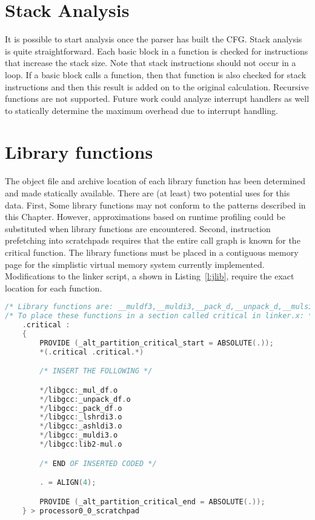 \section{Stack Analysis}
It is possible to start analysis once the parser has built the CFG. Stack analysis is quite straightforward. Each basic block in a function is checked for instructions that increase the stack size. Note that stack instructions should not occur in a loop. If a basic block calls a function, then that function is also checked for stack instructions and then this result is added on to the original calculation. Recursive functions are not supported. Future work could analyze interrupt handlers as well to statically determine the maximum overhead due to interrupt handling.


\section{Library functions}

The object file and archive location of each library function has been determined and made statically available. There are (at least) two potential uses for this data. First, Some library functions may not conform to the patterns described in this Chapter. However, approximations based on runtime profiling could be substituted when library functions are encountered. Second, instruction prefetching into scratchpads requires that the entire call graph is known for the critical function. The library functions must be placed in a contiguous memory page for the simplistic virtual memory system currently implemented. Modifications to the linker script, a shown in Listing~\ref{l:jlib}, require the exact location for each function.

% 
\begin{lstlisting}[caption={Placing library functions in \texttt{.critical} region},label=l:jlib,language=C]
/* Library functions are: __muldf3,__muldi3,__pack_d,__unpack_d,__mulsi3,__lshrdi3,__ashldi3 */
/* To place these functions in a section called critical in linker.x: */
    .critical :
    {
        PROVIDE (_alt_partition_critical_start = ABSOLUTE(.));
        *(.critical .critical.*)

        /* INSERT THE FOLLOWING */

        */libgcc:_mul_df.o
        */libgcc:_unpack_df.o
        */libgcc:_pack_df.o
        */libgcc:_lshrdi3.o
        */libgcc:_ashldi3.o
        */libgcc:_muldi3.o
        */libgcc:lib2-mul.o

        /* END OF INSERTED CODED */

        . = ALIGN(4);

        PROVIDE (_alt_partition_critical_end = ABSOLUTE(.));
    } > processor0_0_scratchpad


\end{lstlisting}


